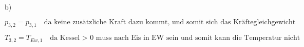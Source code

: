 b)

\[
p_{3,2} = p_{3,1} \quad \text{da keine zusätzliche Kraft dazu kommt, und somit sich das Kräftegleichgewicht nicht ändert}
\]

\[
T_{3,2} = T_{Ew,1} \quad \text{da Kessel > 0 muss nach Eis in EW sein und somit kann die Temperatur nicht ansteigen, da das Gas in EW im thermodynamischen GGW sind, müssen die Temperaturen gleich sein}
\]